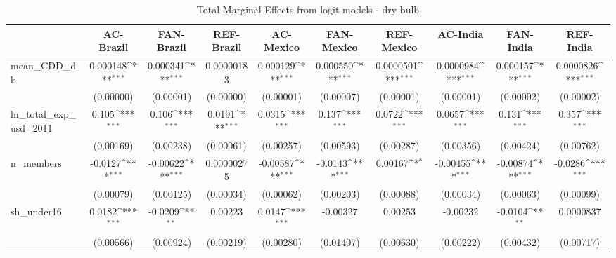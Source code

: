 \begin{table}[htbp]\centering
\def\sym#1{\ifmmode^{#1}\else\(^{#1}\)\fi}
\caption{Total Marginal Effects from logit models - dry bulb}
\begin{tabular}{l*{9}{c}}
\hline\hline
            &\multicolumn{1}{c}{AC-Brazil}&\multicolumn{1}{c}{FAN-Brazil}&\multicolumn{1}{c}{REF-Brazil}&\multicolumn{1}{c}{AC-Mexico}&\multicolumn{1}{c}{FAN-Mexico}&\multicolumn{1}{c}{REF-Mexico}&\multicolumn{1}{c}{AC-India}&\multicolumn{1}{c}{FAN-India}&\multicolumn{1}{c}{REF-India}\\
\hline
mean\_CDD\_db &    0.000148\sym{***}&    0.000341\sym{***}&  0.00000183         &    0.000129\sym{***}&    0.000550\sym{***}&   0.0000501\sym{***}&   0.0000984\sym{***}&    0.000157\sym{***}&   0.0000826\sym{***}\\
            &   (0.00000)         &   (0.00001)         &   (0.00000)         &   (0.00001)         &   (0.00007)         &   (0.00001)         &   (0.00001)         &   (0.00002)         &   (0.00002)         \\
ln\_total\_exp\_usd\_2011&       0.105\sym{***}&       0.106\sym{***}&      0.0191\sym{***}&      0.0315\sym{***}&       0.137\sym{***}&      0.0722\sym{***}&      0.0657\sym{***}&       0.131\sym{***}&       0.357\sym{***}\\
            &   (0.00169)         &   (0.00238)         &   (0.00061)         &   (0.00257)         &   (0.00593)         &   (0.00287)         &   (0.00356)         &   (0.00424)         &   (0.00762)         \\
n\_members   &     -0.0127\sym{***}&    -0.00622\sym{***}&  0.00000275         &    -0.00587\sym{***}&     -0.0143\sym{***}&     0.00167\sym{*}  &    -0.00455\sym{***}&    -0.00874\sym{***}&     -0.0286\sym{***}\\
            &   (0.00079)         &   (0.00125)         &   (0.00034)         &   (0.00062)         &   (0.00203)         &   (0.00088)         &   (0.00034)         &   (0.00063)         &   (0.00099)         \\
sh\_under16  &      0.0182\sym{***}&     -0.0209\sym{**} &     0.00223         &      0.0147\sym{***}&    -0.00327         &     0.00253         &    -0.00232         &     -0.0104\sym{**} &   0.0000837         \\
            &   (0.00566)         &   (0.00924)         &   (0.00219)         &   (0.00280)         &   (0.01407)         &   (0.00630)         &   (0.00222)         &   (0.00432)         &   (0.00717)         \\

\end{tabular}
\end{table}
